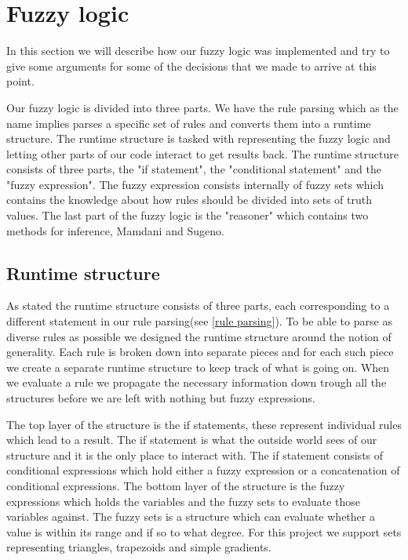 \section{Fuzzy logic}\label{fuzzy logic}
In this section we will describe how our fuzzy logic was implemented and try to
give some arguments for some of the decisions that we made to arrive
at this point.

Our fuzzy logic is divided into three parts. We have the rule parsing which as
the name implies parses a specific set of rules and converts them into a runtime
structure. The runtime structure is tasked with representing the fuzzy logic and
letting other parts of our code interact to get results back. The runtime structure
consists of three parts, the "if statement", the "conditional statement" and
the "fuzzy expression". The fuzzy expression consists internally of fuzzy sets
which contains the knowledge about how rules should be divided into sets of truth
values. The last part of the fuzzy logic is the "reasoner" which contains two 
methods for inference, Mamdani and Sugeno.

\subsection{Runtime structure}\label{runtime structure}
As stated the runtime structure consists of three parts, each corresponding to
a different statement in our rule parsing(see \ref{rule parsing}). To be able
to parse as diverse rules as possible we designed the runtime structure around
the notion of generality. Each rule is broken down into separate pieces and for
each such piece we create a separate runtime structure to keep track of what
is going on. When we evaluate a rule we propagate the necessary information
down trough all the structures before we are left with nothing but fuzzy expressions.

The top layer of the structure is the if statements, these represent individual
rules which lead to a result. The if statement is what the outside world sees
of our structure and it is the only place to interact with. The if statement
consists of conditional expressions which hold either a fuzzy expression or
a concatenation of conditional expressions. The bottom layer of the structure
is the fuzzy expressions which holds the variables and the fuzzy sets to evaluate
those variables against. The fuzzy sets is a structure which can evaluate whether
a value is within its range and if so to what degree. For this project
we support sets representing triangles, trapezoids and simple gradients.

